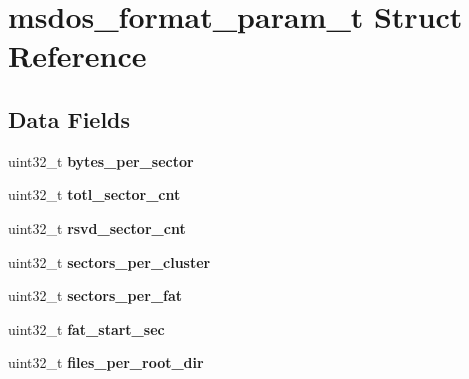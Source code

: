 \hypertarget{structmsdos__format__param__t}{}\section{msdos\+\_\+format\+\_\+param\+\_\+t Struct Reference}
\label{structmsdos__format__param__t}
\subsection*{Data Fields}
\begin{DoxyCompactItemize}
\item 
\mbox{\label{structmsdos__format__param__t_a3886be749d0d898ad6b78a86e2959d51}} 
uint32\+\_\+t {\bfseries bytes\+\_\+per\+\_\+sector}
\item 
\mbox{\label{structmsdos__format__param__t_ad21184d8e241c897591239863c015584}} 
uint32\+\_\+t {\bfseries totl\+\_\+sector\+\_\+cnt}
\item 
\mbox{\label{structmsdos__format__param__t_a806823b5d40cae86e3fe36821a4f2545}} 
uint32\+\_\+t {\bfseries rsvd\+\_\+sector\+\_\+cnt}
\item 
\mbox{\label{structmsdos__format__param__t_a83ffa6d50878d6a4a9b815ef9c3efa14}} 
uint32\+\_\+t {\bfseries sectors\+\_\+per\+\_\+cluster}
\item 
\mbox{\label{structmsdos__format__param__t_a535c5478eb40ae756eeca5bd6d42ca98}} 
uint32\+\_\+t {\bfseries sectors\+\_\+per\+\_\+fat}
\item 
\mbox{\label{structmsdos__format__param__t_a03bca4994e6e5f4c583fe32b71096e01}} 
uint32\+\_\+t {\bfseries fat\+\_\+start\+\_\+sec}
\item 
\mbox{\label{structmsdos__format__param__t_a11d69c8afcfcc96afe3dc577a9be8f78}} 
uint32\+\_\+t {\bfseries files\+\_\+per\+\_\+root\+\_\+dir}
\item 
\mbox{\label{structmsdos__format__param__t_ae0d4ce75a69bde9c6cc8bdc2f6b4da14}} 

\end{DoxyCompactItemize}
